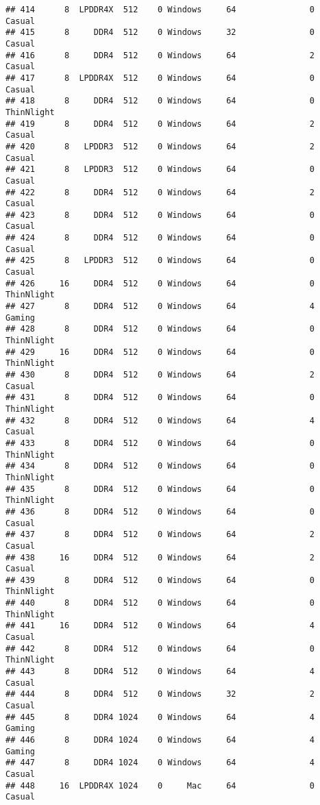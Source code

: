 \documentclass[
]{article}
\begin{document}
\begin{verbatim}
## 414      8  LPDDR4X  512    0 Windows     64               0     Casual
## 415      8     DDR4  512    0 Windows     32               0     Casual
## 416      8     DDR4  512    0 Windows     64               2     Casual
## 417      8  LPDDR4X  512    0 Windows     64               0     Casual
## 418      8     DDR4  512    0 Windows     64               0 ThinNlight
## 419      8     DDR4  512    0 Windows     64               2     Casual
## 420      8   LPDDR3  512    0 Windows     64               2     Casual
## 421      8   LPDDR3  512    0 Windows     64               0     Casual
## 422      8     DDR4  512    0 Windows     64               2     Casual
## 423      8     DDR4  512    0 Windows     64               0     Casual
## 424      8     DDR4  512    0 Windows     64               0     Casual
## 425      8   LPDDR3  512    0 Windows     64               0     Casual
## 426     16     DDR4  512    0 Windows     64               0 ThinNlight
## 427      8     DDR4  512    0 Windows     64               4     Gaming
## 428      8     DDR4  512    0 Windows     64               0 ThinNlight
## 429     16     DDR4  512    0 Windows     64               0 ThinNlight
## 430      8     DDR4  512    0 Windows     64               2     Casual
## 431      8     DDR4  512    0 Windows     64               0 ThinNlight
## 432      8     DDR4  512    0 Windows     64               4     Casual
## 433      8     DDR4  512    0 Windows     64               0 ThinNlight
## 434      8     DDR4  512    0 Windows     64               0 ThinNlight
## 435      8     DDR4  512    0 Windows     64               0 ThinNlight
## 436      8     DDR4  512    0 Windows     64               0     Casual
## 437      8     DDR4  512    0 Windows     64               2     Casual
## 438     16     DDR4  512    0 Windows     64               2     Casual
## 439      8     DDR4  512    0 Windows     64               0 ThinNlight
## 440      8     DDR4  512    0 Windows     64               0 ThinNlight
## 441     16     DDR4  512    0 Windows     64               4     Casual
## 442      8     DDR4  512    0 Windows     64               0 ThinNlight
## 443      8     DDR4  512    0 Windows     64               4     Casual
## 444      8     DDR4  512    0 Windows     32               2     Casual
## 445      8     DDR4 1024    0 Windows     64               4     Gaming
## 446      8     DDR4 1024    0 Windows     64               4     Gaming
## 447      8     DDR4 1024    0 Windows     64               4     Casual
## 448     16  LPDDR4X 1024    0     Mac     64               0     Casual

\end{verbatim}
\end{document}
